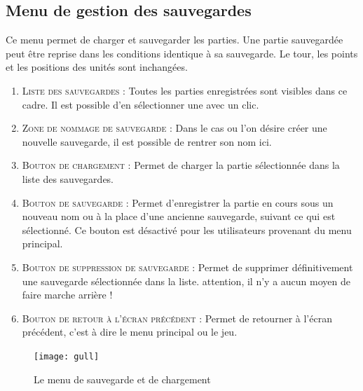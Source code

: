	\subsection{Menu de gestion des sauvegardes}
		\label{subsec:sauvergardes}
		Ce menu permet de charger et sauvegarder les parties. Une partie sauvegardée peut être reprise dans les conditions identique à sa sauvegarde. Le tour, les points et les positions des unités sont inchangées.
		\begin{enumerate}
			\item \textsc{Liste des sauvegardes} : Toutes les parties enregistrées sont visibles dans ce cadre. Il est possible d'en sélectionner une avec un clic.
			\item \textsc{Zone de nommage de sauvegarde} : Dans le cas ou l'on désire créer une nouvelle sauvegarde, il est possible de rentrer son nom ici.
			\item \textsc{Bouton de chargement} : Permet de charger la partie sélectionnée dans la liste des sauvegardes.
			\item \textsc{Bouton de sauvegarde} : Permet d'enregistrer la partie en cours sous un nouveau nom ou à la place d'une ancienne sauvegarde, suivant ce qui est sélectionné. 
					Ce bouton est désactivé pour les utilisateurs provenant du menu principal.
			\item \textsc{Bouton de suppression de sauvegarde} : Permet de supprimer définitivement une sauvegarde sélectionnée dans la liste. attention, il n'y a aucun moyen de faire marche arrière !
			\item \textsc{Bouton de retour à l'écran précédent} : Permet de retourner à l'écran précédent, c'est à dire le menu principal ou le jeu.	
		\end{enumerate}
		
		\begin{figure}[h!]
			\caption{Le menu de sauvegarde et de chargement}
			\label{fig:menuCreat}
			\centering
			\texttt{[image: gull]}
		\end{figure}
		
